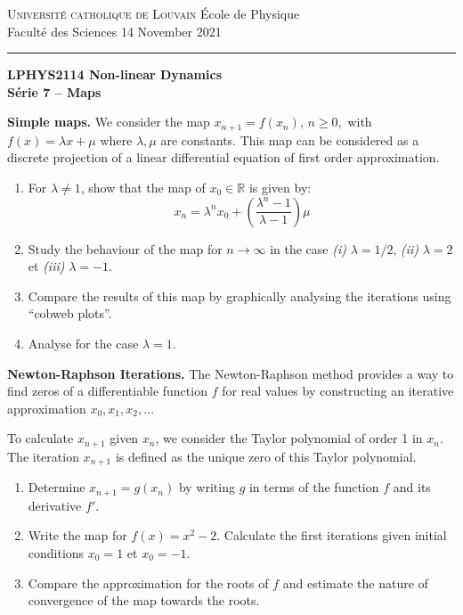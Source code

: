 \documentclass{article}
\begin{document}
\noindent
{\textsc{Universit\'e catholique de Louvain}} \hfill \'Ecole de Physique\\
Facult\'e des Sciences \hfill 14 November 2021\\
\hrule

\bigskip

\begin{center}
  \textbf{LPHYS2114 Non-linear Dynamics}\\
  \textbf{S\'erie 7 -- Maps} 
\end{center}

{}

\begin{question}
  \textbf{Simple maps.} We consider the map $x_{n+1} = f(x_n),\,n\geqslant 0,$ with $f(x) = \lambda x+\mu$ where $\lambda,\mu$ are constants. This map can be considered as a discrete projection of a linear differential equation of first order approximation.
  \begin{enumerate}[label=(\alph*)]
    \item For $\lambda \neq 1$, show that the map of $x_0 \in \mathbb R$ is given by: 
    \begin{equation}
      x_n = \lambda^n x_0 + \left(\frac{\lambda^n - 1}{\lambda -1}\right)\mu
    \end{equation}
    \item Study the behaviour of the map for $n\to \infty$ in the case \textit{(i)} $\lambda = 1/2$, \textit{(ii)} $\lambda =2$ et \textit{(iii)} $\lambda = -1$.
    \item Compare the results of this map by graphically analysing the iterations using ``cobweb plots''.
    \item Analyse for the case $\lambda=1$.
  \end{enumerate}
\end{question}

\begin{question}
  \textbf{Newton-Raphson Iterations.} The Newton-Raphson method provides a way to find zeros of a differentiable function $f$ for real values by constructing an iterative approximation $x_0,x_1,x_2,\dots$
  
  \medskip
  \noindent
  To calculate $x_{n+1}$ given $x_n$, we consider the Taylor polynomial of order 1 in $x_n$. The iteration $x_{n+1}$ is defined as the unique zero of this Taylor polynomial.
  
   \begin{enumerate}[label=(\alph*)]
    \item Determine $x_{n+1} = g(x_n)$ by writing $g$ in terms of the function $f$ and its derivative $f'$.
    \item Write the map for $f(x) = x^2-2$. Calculate the first iterations given initial conditions $x_0=1$ et $x_0=-1$. 
    \item Compare the approximation for the roots of $f$ and estimate the nature of convergence of the map towards the roots.
   \end{enumerate}
\end{question}
\end{document}

